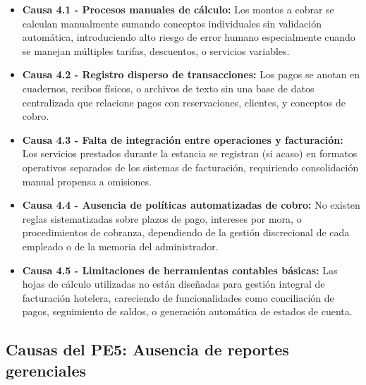 	\begin{itemize}
		\item \textbf{Causa 4.1 - Procesos manuales de cálculo:} Los montos a cobrar se calculan manualmente sumando conceptos individuales sin validación automática, introduciendo alto riesgo de error humano especialmente cuando se manejan múltiples tarifas, descuentos, o servicios variables.
		
		\item \textbf{Causa 4.2 - Registro disperso de transacciones:} Los pagos se anotan en cuadernos, recibos físicos, o archivos de texto sin una base de datos centralizada que relacione pagos con reservaciones, clientes, y conceptos de cobro.
		
		\item \textbf{Causa 4.3 - Falta de integración entre operaciones y facturación:} Los servicios prestados durante la estancia se registran (si acaso) en formatos operativos separados de los sistemas de facturación, requiriendo consolidación manual propensa a omisiones.
		
		\item \textbf{Causa 4.4 - Ausencia de políticas automatizadas de cobro:} No existen reglas sistematizadas sobre plazos de pago, intereses por mora, o procedimientos de cobranza, dependiendo de la gestión discrecional de cada empleado o de la memoria del administrador.
		
		\item \textbf{Causa 4.5 - Limitaciones de herramientas contables básicas:} Las hojas de cálculo utilizadas no están diseñadas para gestión integral de facturación hotelera, careciendo de funcionalidades como conciliación de pagos, seguimiento de saldos, o generación automática de estados de cuenta.
	\end{itemize}

\subsection{Causas del PE5: Ausencia de reportes gerenciales}
\label{sec:causas5}

